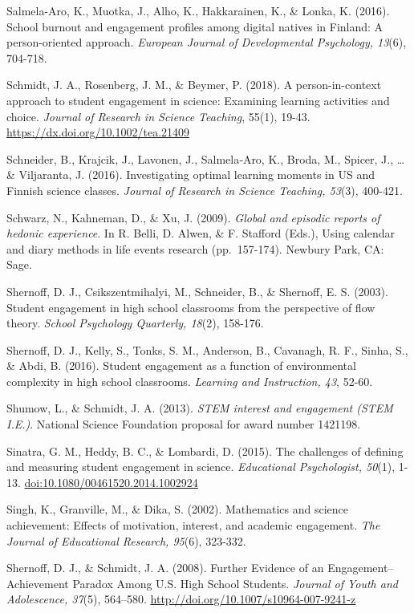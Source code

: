 \documentclass[]{msu-thesis}
\theoremstyle{definition}
\theoremstyle{definition}
\theoremstyle{definition}
\theoremstyle{remark}
\begin{document}
Salmela-Aro, K., Muotka, J., Alho, K., Hakkarainen, K., \& Lonka, K.
(2016). School burnout and engagement profiles among digital natives in
Finland: A person-oriented approach. \emph{European Journal of
Developmental Psychology, 13}(6), 704-718.

Schmidt, J. A., Rosenberg, J. M., \& Beymer, P. (2018). A
person-in-context approach to student engagement in science: Examining
learning activities and choice. \emph{Journal of Research in Science
Teaching}, 55(1), 19-43. \url{https://dx.doi.org/10.1002/tea.21409}

Schneider, B., Krajcik, J., Lavonen, J., Salmela‐Aro, K., Broda, M.,
Spicer, J., \ldots{} \& Viljaranta, J. (2016). Investigating optimal
learning moments in US and Finnish science classes. \emph{Journal of
Research in Science Teaching, 53}(3), 400-421.

Schwarz, N., Kahneman, D., \& Xu, J. (2009). \emph{Global and episodic
reports of hedonic experience}. In R. Belli, D. Alwen, \& F. Stafford
(Eds.), Using calendar and diary methods in life events research
(pp.~157-174). Newbury Park, CA: Sage.

Shernoff, D. J., Csikszentmihalyi, M., Schneider, B., \& Shernoff, E. S.
(2003). Student engagement in high school classrooms from the
perspective of flow theory. \emph{School Psychology Quarterly, 18}(2),
158-176.

Shernoff, D. J., Kelly, S., Tonks, S. M., Anderson, B., Cavanagh, R. F.,
Sinha, S., \& Abdi, B. (2016). Student engagement as a function of
environmental complexity in high school classrooms. \emph{Learning and
Instruction, 43}, 52-60.

Shumow, L., \& Schmidt, J. A. (2013). \emph{STEM interest and engagement
(STEM I.E.)}. National Science Foundation proposal for award number
1421198.

Sinatra, G. M., Heddy, B. C., \& Lombardi, D. (2015). The challenges of
defining and measuring student engagement in science. \emph{Educational
Psychologist, 50}(1), 1-13. \url{doi:10.1080/00461520.2014.1002924}

Singh, K., Granville, M., \& Dika, S. (2002). Mathematics and science
achievement: Effects of motivation, interest, and academic engagement.
\emph{The Journal of Educational Research, 95}(6), 323-332.

Shernoff, D. J., \& Schmidt, J. A. (2008). Further Evidence of an
Engagement--Achievement Paradox Among U.S. High School Students.
\emph{Journal of Youth and Adolescence, 37}(5), 564--580.
\url{http://doi.org/10.1007/s10964-007-9241-z}
\end{document}
